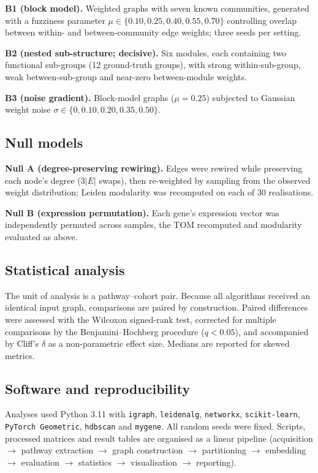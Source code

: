 \documentclass[twocolumn,11pt]{article}
\begin{document}
\noindent\textbf{B1 (block model).} Weighted graphs with seven known communities, generated
with a fuzziness parameter $\mu\in\{0.10,0.25,0.40,0.55,0.70\}$ controlling overlap between
within- and between-community edge weights; three seeds per setting.

\noindent\textbf{B2 (nested sub-structure; decisive).} Six modules, each containing two
functional sub-groups (12 ground-truth groups), with strong within-sub-group, weak
between-sub-group and near-zero between-module weights.

\noindent\textbf{B3 (noise gradient).} Block-model graphs ($\mu=0.25$) subjected to
Gaussian weight noise $\sigma\in\{0,0.10,0.20,0.35,0.50\}$.

\subsection{Null models}

\noindent\textbf{Null A (degree-preserving rewiring).} Edges were rewired while preserving
each node's degree ($3|E|$ swaps), then re-weighted by sampling from the observed weight
distribution; Leiden modularity was recomputed on each of 30 realisations.

\noindent\textbf{Null B (expression permutation).} Each gene's expression vector was
independently permuted across samples, the TOM recomputed and modularity evaluated as above.

\subsection{Statistical analysis}

The unit of analysis is a pathway--cohort pair. Because all algorithms received an identical
input graph, comparisons are paired by construction. Paired differences were assessed with
the Wilcoxon signed-rank test, corrected for multiple comparisons by the
Benjamini--Hochberg procedure \citep{benjamini1995fdr} ($q<0.05$), and accompanied by
Cliff's $\delta$ as a non-parametric effect size. Medians are reported for skewed metrics.

\subsection{Software and reproducibility}

Analyses used Python 3.11 with \texttt{igraph}, \texttt{leidenalg}, \texttt{networkx},
\texttt{scikit-learn}, \texttt{PyTorch Geometric}, \texttt{hdbscan} and \texttt{mygene}.
All random seeds were fixed. Scripts, processed matrices and result tables are organised as
a linear pipeline (acquisition $\rightarrow$ pathway extraction $\rightarrow$ graph
construction $\rightarrow$ partitioning $\rightarrow$ embedding $\rightarrow$ evaluation
$\rightarrow$ statistics $\rightarrow$ visualisation $\rightarrow$ reporting).
\end{document}
